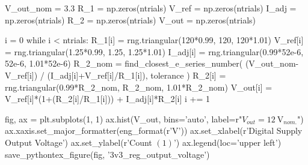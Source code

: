 \documentclass[12pt, titlepage]{/home/air/projects/latex-template/tex-template}
\begin{document}
\begin{pycode}
V_out_nom = 3.3
R_1 = np.zeros(ntrials)
V_ref = np.zeros(ntrials)
I_adj = np.zeros(ntrials)
R_2 = np.zeros(ntrials)
V_out = np.zeros(ntrials)

i = 0
while i < ntrials: 
    R_1[i] = rng.triangular(120*0.99, 120, 120*1.01)
    V_ref[i] = rng.triangular(1.25*0.99, 1.25, 1.25*1.01)
    I_adj[i] = rng.triangular(0.99*52e-6, 52e-6, 1.01*52e-6)
    R_2_nom = find_closest_e_series_number(
        (V_out_nom-V_ref[i]) / (I_adj[i]+V_ref[i]/R_1[i]),
        tolerance
        )
    R_2[i] = rng.triangular(0.99*R_2_nom, R_2_nom, 1.01*R_2_nom)
    V_out[i] = V_ref[i]*(1+(R_2[i]/R_1[i])) + I_adj[i]*R_2[i]
    i += 1

fig, ax = plt.subplots(1, 1)
ax.hist(V_out, bins='auto', label=r"$V_{out}=\SI{12}{\volt}_{nom.}$")
ax.xaxis.set_major_formatter(eng_format(r'\unit{\volt}'))
ax.set_xlabel(r'Digital Supply Output Voltage')
ax.set_ylabel(r'Count $\left(1\right)$')
ax.legend(loc='upper left')
save_pythontex_figure(fig, '3v3_reg_output_voltage')
\end{pycode}
\end{document}

